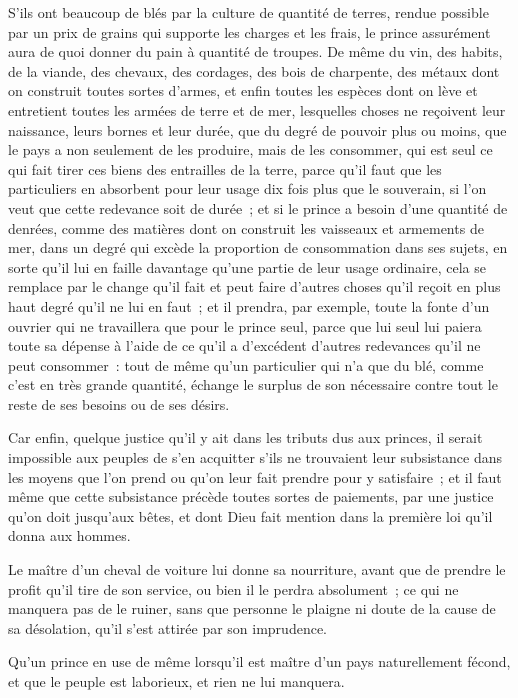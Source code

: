 \documentclass[french,twoside]{book} %
\begin{document}
S’ils ont beaucoup de blés par la culture de quantité de terres, rendue possible par un prix de grains qui supporte les charges et les frais, le prince assurément aura de quoi donner du pain à quantité de troupes. De même du vin, des habits, de la viande, des chevaux, des cordages, des bois de charpente, des métaux dont on construit toutes sortes d’armes, et enfin toutes les espèces dont on lève et entretient toutes les armées de terre et de mer, lesquelles choses ne reçoivent leur naissance, leurs bornes et leur durée, que du degré de pouvoir plus ou moins, que le pays a non seulement de les produire, mais de les consommer, qui est seul ce qui fait tirer ces biens des entrailles de la terre, parce qu’il faut que les particuliers en absorbent pour leur usage dix fois plus que le souverain, si l’on veut que cette redevance soit de durée ; et si le prince a besoin d’une quantité de denrées, comme des matières dont on construit les vaisseaux et armements de mer, dans un degré qui excède la proportion de consommation dans ses sujets, en sorte qu’il lui en faille davantage qu’une partie de leur usage ordinaire, cela se remplace par le change qu’il fait et peut faire d’autres choses qu’il reçoit en plus haut degré qu’il ne lui en faut ; et il prendra, par exemple, toute la fonte d’un ouvrier qui ne travaillera que pour le prince seul, parce que lui seul lui paiera toute sa dépense à l’aide de ce qu’il a d’excédent d’autres redevances qu’il ne peut consommer : tout de même qu’un particulier qui n’a que du blé, comme c’est en très grande quantité, échange le surplus de son nécessaire contre tout le reste de ses besoins ou de ses désirs.\par
Car enfin, quelque justice qu’il y ait dans les tributs dus aux princes, il serait impossible aux peuples de s’en acquitter s’ils ne trouvaient leur subsistance dans les moyens que l’on prend ou qu’on leur fait prendre pour y satisfaire ; et il faut même que cette subsistance précède toutes sortes de paiements, par une justice qu’on doit jusqu’aux bêtes, et dont Dieu fait mention dans la première loi qu’il donna aux hommes.\par
Le maître d’un cheval de voiture lui donne sa nourriture, avant que de prendre le profit qu’il tire de son service, ou bien il le perdra absolument ; ce qui ne manquera pas de le ruiner, sans que personne le plaigne ni doute de la cause de sa désolation, qu’il s’est attirée par son imprudence.\par
Qu’un prince en use de même lorsqu’il est maître d’un pays naturellement fécond, et que le peuple est laborieux, et rien ne lui manquera.\par
\end{document}
